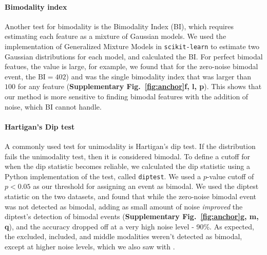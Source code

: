 

\paragraph{Bimodality index}
Another test for bimodality is the Bimodality Index\cite{Wang:2009wm} (BI), which requires estimating each feature as a mixture of Gaussian models. We used the implementation of Generalized Mixture Models in \texttt{scikit-learn}\cite{Pedregosa:2011tv} to estimate two Gaussian distributions for each model, and calculated the BI. For perfect bimodal featues, the value is large, for example, we found that for the zero-noise bimodal event, the $\mathrm{BI}=402$) and was the single bimodality index that was larger than $100$ for any feature (\textbf{Supplementary Fig.~\ref{fig:anchor}f, l, p}). This shows that our method is more sensitive to finding bimodal features with the addition of noise, which BI cannot handle.

\paragraph{Hartigan's Dip test} 
A commonly used test for unimodality is Hartigan's dip test\cite{Hartigan:1985ca}. If the distribution fails the unimodality test, then it is considered bimodal. To define a cutoff for when the dip statistic becomes reliable, we calculated the dip statistic using a Python implementation of the test, called \texttt{diptest}\cite{Anonymous:zTNIPlgQ}. We used a $p$-value cutoff of $p <0.05$ as our threshold for assigning an event as bimodal. We used the diptest statistic on the two datasets, and found that while the zero-noise bimodal event was not detected as bimodal, adding as small amount of noise \emph{improved} the diptest's detection of bimodal events (\textbf{Supplementary Fig.~\ref{fig:anchor}g, m, q}), and the accuracy dropped off at a very high noise level - 90\%. As expected, the excluded, included, and middle modalities weren't detected as bimodal, except at higher noise levels, which we also saw with \anchor.


